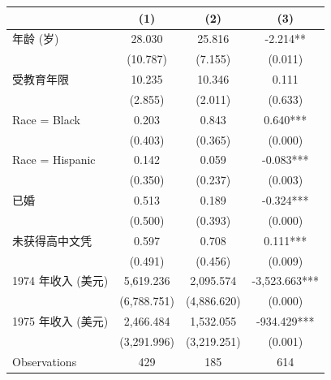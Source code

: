 \begin{tabular}{l*{3}c}
\hline\hline
 & (1) & (2) & (3) \\
\hline
年龄 (岁)&28.030&25.816&-2.214**\\
&(10.787)&(7.155)&(0.011)\\
受教育年限&10.235&10.346&0.111\\
&(2.855)&(2.011)&(0.633)\\
Race = Black&0.203&0.843&0.640***\\
&(0.403)&(0.365)&(0.000)\\
Race = Hispanic&0.142&0.059&-0.083***\\
&(0.350)&(0.237)&(0.003)\\
已婚&0.513&0.189&-0.324***\\
&(0.500)&(0.393)&(0.000)\\
未获得高中文凭&0.597&0.708&0.111***\\
&(0.491)&(0.456)&(0.009)\\
1974 年收入 (美元)&5,619.236&2,095.574&-3,523.663***\\
&(6,788.751)&(4,886.620)&(0.000)\\
1975 年收入 (美元)&2,466.484&1,532.055&-934.429***\\
&(3,291.996)&(3,219.251)&(0.001)\\
\hline
Observations & 429 & 185 & 614 \\
\hline\hline
\end{tabular}
